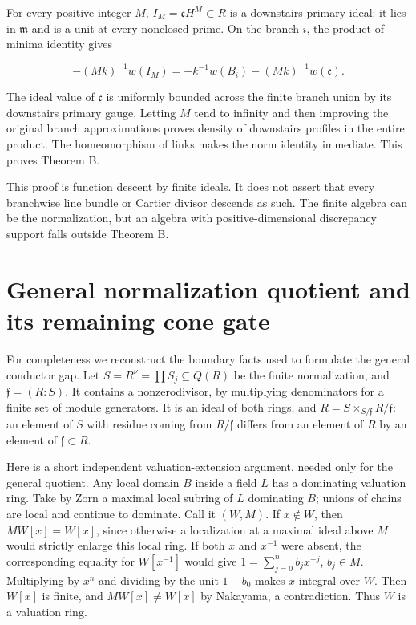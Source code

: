 \documentclass[11pt]{article}
\begin{document}
For every positive integer \(M\), \(I_M=\mathfrak c H^M\subset R\) is a downstairs primary ideal: it lies in \(\mathfrak m\) and is a unit at every nonclosed prime. On the branch \(i\), the product-of-minima identity gives

\[
-(Mk)^{-1}w(I_M)=-k^{-1}w(B_i)-(Mk)^{-1}w(\mathfrak c). \tag{4}
\]

The ideal value of \(\mathfrak c\) is uniformly bounded across the finite branch union by its downstairs primary gauge. Letting \(M\) tend to infinity and then improving the original branch approximations proves density of downstairs profiles in the entire product. The homeomorphism of links makes the norm identity immediate. This proves Theorem B.

This proof is function descent by finite ideals. It does not assert that every branchwise line bundle or Cartier divisor descends as such. The finite algebra can be the normalization, but an algebra with positive-dimensional discrepancy support falls outside Theorem B.

\section{General normalization quotient and its remaining cone gate}

For completeness we reconstruct the boundary facts used to formulate the general conductor gap. Let \(S=R^\nu=\prod S_j\subseteq Q(R)\) be the finite normalization, and \(\mathfrak f=(R:S)\). It contains a nonzerodivisor, by multiplying denominators for a finite set of module generators. It is an ideal of both rings, and \(R=S\times_{S/\mathfrak f}R/\mathfrak f\): an element of \(S\) with residue coming from \(R/\mathfrak f\) differs from an element of \(R\) by an element of \(\mathfrak f\subset R\).

Here is a short independent valuation-extension argument, needed only for the general quotient. Any local domain \(B\) inside a field \(L\) has a dominating valuation ring. Take by Zorn a maximal local subring of \(L\) dominating \(B\); unions of chains are local and continue to dominate. Call it \((W,M)\). If \(x\notin W\), then \(MW[x]=W[x]\), since otherwise a localization at a maximal ideal above \(M\) would strictly enlarge this local ring. If both \(x\) and \(x^{-1}\) were absent, the corresponding equality for \(W[x^{-1}]\) would give \(1=\sum_{j=0}^n b_jx^{-j}\), \(b_j\in M\). Multiplying by \(x^n\) and dividing by the unit \(1-b_0\) makes \(x\) integral over \(W\). Then \(W[x]\) is finite, and \(MW[x]\ne W[x]\) by Nakayama, a contradiction. Thus \(W\) is a valuation ring.
\end{document}

